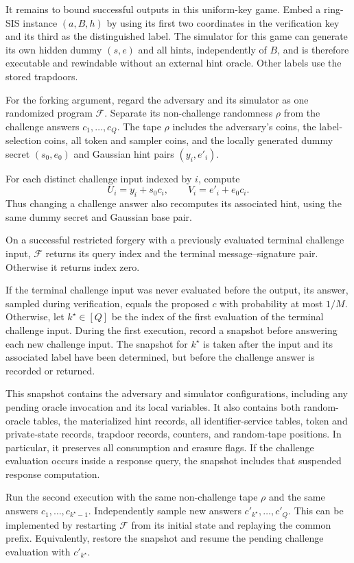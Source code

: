 \documentclass[lettersize,journal]{IEEEtran}
\begin{document}
	It remains to bound successful outputs in this uniform-key game. Embed a
	ring-SIS instance $(a,B,h)$ by using its first two coordinates in the
	verification key and its third as the distinguished label. The simulator
	for this game can generate its own hidden dummy $(s,e)$ and all hints,
	independently of $B$, and is therefore executable and rewindable without
	an external hint oracle. Other labels use the stored trapdoors.
	
	For the forking argument, regard the adversary and its simulator
	as one randomized program $\mathcal F$.
	Separate its non-challenge randomness $\rho$ from the challenge
	answers $c_1,\ldots,c_Q$.
	The tape $\rho$ includes the adversary's coins, the label-selection
	coins, all token and sampler coins, and the locally generated
	dummy secret $(s_0,e_0)$ and Gaussian hint pairs $(y_i,e'_i)$.
	
	For each distinct challenge input indexed by $i$, compute
	\[
	U_i=y_i+s_0c_i,\qquad V_i=e'_i+e_0c_i.
	\]
	Thus changing a challenge answer also recomputes its associated hint,
	using the same dummy secret and Gaussian base pair.
	
	On a successful restricted forgery with a previously evaluated
	terminal challenge input, $\mathcal F$ returns its query index
	and the terminal message--signature pair.
	Otherwise it returns index zero.
	
	If the terminal challenge input was never evaluated before the output,
	its answer, sampled during verification, equals the proposed $c$ with
	probability at most $1/M$. Otherwise, let $k^\star\in[Q]$ be the index of the first
	evaluation of the terminal challenge input.
	During the first execution, record a snapshot before answering
	each new challenge input.
	The snapshot for $k^\star$ is taken after the input and its
	associated label have been determined, but before the challenge
	answer is recorded or returned.
	
	This snapshot contains the adversary and simulator configurations,
	including any pending oracle invocation and its local variables.
	It also contains both random-oracle tables, the materialized hint
	records, all identifier-service tables, token and private-state
	records, trapdoor records, counters, and random-tape positions.
	In particular, it preserves all consumption and erasure flags.
	If the challenge evaluation occurs inside a response query,
	the snapshot includes that suspended response computation.
	
	Run the second execution with the same non-challenge tape $\rho$
	and the same answers $c_1,\ldots,c_{k^\star-1}$.
	Independently sample new answers
	$c'_{k^\star},\ldots,c'_Q$.
	This can be implemented by restarting $\mathcal F$ from its initial
	state and replaying the common prefix.
	Equivalently, restore the snapshot and resume the pending challenge
	evaluation with $c'_{k^\star}$.
	
\end{document}
